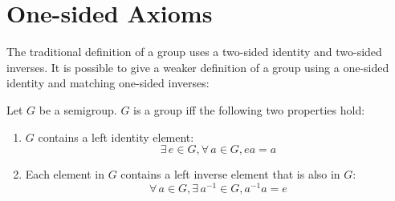 \documentclass[letterpaper,12pt,fleqn]{article}
\begin{document}
\section*{One-sided Axioms}

The traditional definition of a group uses a two-sided identity and two-sided
inverses. It is possible to give a weaker definition of a group using a
one-sided identity and matching one-sided inverses:

\begin{theorem}
  Let $G$ be a semigroup. $G$ is a group iff the following two properties hold:
  \begin{enumerate}
  \item $G$ contains a left identity element:
    \[\exists\,e\in G,\forall\,a\in G,ea=a\]
  \item Each element in $G$ contains a left inverse element that is also in
    $G$:
    \[\forall\,a\in G,\exists\,a^{-1}\in G,a^{-1}a=e\]
  \end{enumerate}
\end{theorem}
\end{document}
